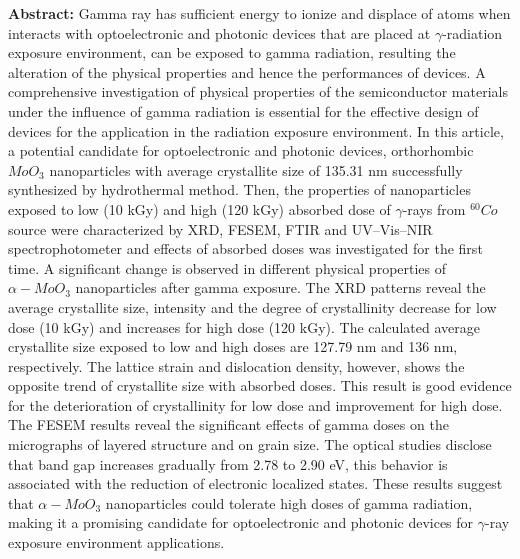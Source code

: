 \documentclass[a4paper,20pt]{article}
\begin{document}
    \begin{minipage}{.98\linewidth} \begin{flushleft}
    
    		\textbf{Abstract:} Gamma ray has sufficient energy to ionize and displace of atoms when interacts with optoelectronic and photonic devices that are placed at $\gamma$-radiation exposure environment, can be exposed to gamma radiation, resulting the alteration of the physical properties and hence the performances of devices. A comprehensive investigation of physical properties of the semiconductor materials under the influence of gamma radiation is essential for the effective design of devices for the application in the radiation exposure environment. In this article, a potential candidate for optoelectronic and photonic devices, orthorhombic $MoO_3$ nanoparticles with average crystallite size of 135.31 nm successfully synthesized by hydrothermal method. Then, the properties of nanoparticles exposed to low (10 kGy) and high (120 kGy) absorbed dose of $\gamma$-rays from $^{60}Co$ source were characterized by XRD, FESEM, FTIR and UV–Vis–NIR spectrophotometer and effects of absorbed doses was investigated for the first time. A significant change is observed in different physical properties of $\alpha-MoO_3$ nanoparticles after gamma exposure. The XRD patterns reveal the average crystallite size, intensity and the degree of crystallinity decrease for low dose (10 kGy) and increases for high dose (120 kGy). The calculated average crystallite size exposed to low and high doses are 127.79 nm and 136 nm, respectively. The lattice strain and dislocation density, however, shows the opposite trend of crystallite size with absorbed doses. This result is good evidence for the deterioration of crystallinity for low dose and improvement for high dose. The FESEM results reveal the significant effects of gamma doses on the micrographs of layered structure and on grain size. The optical studies disclose that band gap increases gradually from 2.78 to 2.90 eV, this behavior is associated with the reduction of electronic localized states. These results suggest that $\alpha-MoO_3$ nanoparticles could tolerate high doses of gamma radiation, making it a promising candidate for optoelectronic and photonic devices for $\gamma$-ray exposure environment applications.
    	\end{flushleft} \end{minipage}
    	
\vspace{7pt}
\end{document}
